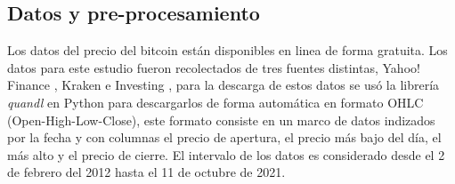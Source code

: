 \subsection{Datos y pre-procesamiento}

Los datos del precio del bitcoin están disponibles en linea de forma gratuita. Los datos para este estudio fueron recolectados de tres fuentes distintas, Yahoo! Finance \cite{YahooFinanceStock}, Kraken \cite{BitcoinCryptocurrencyExchange} e Investing \cite{InvestingComStock}, para la descarga de estos datos se usó la librería \emph{quandl} en Python para descargarlos de forma automática en formato OHLC (Open-High-Low-Close), este formato consiste en un marco de datos indizados por la fecha y con columnas el precio de apertura, el precio más bajo del día, el más alto y el precio de cierre. El intervalo de los datos es considerado desde el 2 de febrero del 2012 hasta el 11 de octubre de 2021.

